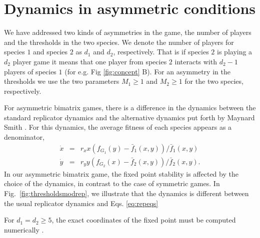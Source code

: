 \documentclass[aps,pre,amsfonts,floatfix, onecolumn,showkeys]{revtex4-1}
\begin{document}
\section{Dynamics in asymmetric conditions}

We have addressed two kinds of asymmetries in the game, the number of players and the thresholds in the two species.
We denote the number of players for species $1$ and species $2$ as $d_1$ and $d_2$, respectively.
That is if species $2$ is playing a $d_2$ player game it means that one player from species $2$ interacts with $d_2-1$ players of species $1$ (for e.g.	Fig \ref{fig:concept} B).
For an asymmetry in the thresholds we use the two parameters $M_1\geq1$ and $M_2\geq1$ for the two species, respectively.

For asymmetric bimatrix games, there is a difference in the dynamics between the standard replicator dynamics and the 
alternative dynamics put forth by Maynard Smith \cite{maynard-smith:book:1982}.
For this dynamics, the average fitness of each species appears as a denominator,
\begin{eqnarray}
\dot{x} &=& r_x x \left(f_{G_1}(y) -  \bar{f}_1(x,y) \right)/\bar{f}_1(x,y) \nonumber \\
\dot{y} &=& r_y y \left(f_{G_2}(x) -  \bar{f}_2(x,y) \right)/\bar{f}_2(x,y).
\label{eq:repeqs}
\end{eqnarray}
In our asymmetric bimatrix game, the fixed point stability is affected by the choice of the dynamics, in contrast to the case of symmetric games. 
In Fig.\ \ref{fig:thresholdsmodrep}, we illustrate that the dynamics is different between the usual 
replicator dynamics and Eqs. \ref{eq:repeqs}

For $d_1=d_2 \geq 5$, the exact coordinates of the fixed point must be computed numerically \cite{abel:AO:1824,stewart:book:2004}.
\end{document}
